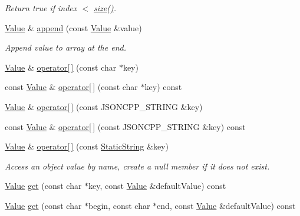 \begin{DoxyCompactItemize}
\begin{DoxyCompactList}\small\item\em Return true if index $<$ \hyperlink{class_json_1_1_value_a4ca8ee6c48a34ca6c2f131956bab5e05}{size()}. \end{DoxyCompactList}\item 
\hyperlink{class_json_1_1_value}{Value} \& \hyperlink{class_json_1_1_value_a7e49ac977e4bcf59745a09d426669f75}{append} (const \hyperlink{class_json_1_1_value}{Value} \&value)
\begin{DoxyCompactList}\small\item\em Append value to array at the end. \end{DoxyCompactList}\item 
\hyperlink{class_json_1_1_value}{Value} \& \hyperlink{class_json_1_1_value_acb912f4ec40a25ea6eb387730885f3d9}{operator\mbox{[}$\,$\mbox{]}} (const char $\ast$key)
\item 
const \hyperlink{class_json_1_1_value}{Value} \& \hyperlink{class_json_1_1_value_ae5f73ffc7a039bca81b7ca771bc5db55}{operator\mbox{[}$\,$\mbox{]}} (const char $\ast$key) const 
\item 
\hyperlink{class_json_1_1_value}{Value} \& \hyperlink{class_json_1_1_value_aedd1e152756a4cc8c1ebac0dd7aeeb78}{operator\mbox{[}$\,$\mbox{]}} (const J\+S\+O\+N\+C\+P\+P\+\_\+\+S\+T\+R\+I\+NG \&key)
\item 
const \hyperlink{class_json_1_1_value}{Value} \& \hyperlink{class_json_1_1_value_a4b4d53dead79ee347514170bd21590b8}{operator\mbox{[}$\,$\mbox{]}} (const J\+S\+O\+N\+C\+P\+P\+\_\+\+S\+T\+R\+I\+NG \&key) const 
\item 
\hyperlink{class_json_1_1_value}{Value} \& \hyperlink{class_json_1_1_value_ac3763d7d315ca65dc188e273722f7955}{operator\mbox{[}$\,$\mbox{]}} (const \hyperlink{class_json_1_1_static_string}{Static\+String} \&key)
\begin{DoxyCompactList}\small\item\em Access an object value by name, create a null member if it does not exist. \end{DoxyCompactList}\item 
\hyperlink{class_json_1_1_value}{Value} \hyperlink{class_json_1_1_value_ab76b3323cde14c7db20676d07b260ce7}{get} (const char $\ast$key, const \hyperlink{class_json_1_1_value}{Value} \&default\+Value) const 
\item 
\hyperlink{class_json_1_1_value}{Value} \hyperlink{class_json_1_1_value_abcb2289c005bc0befdedaa94f662f63f}{get} (const char $\ast$begin, const char $\ast$end, const \hyperlink{class_json_1_1_value}{Value} \&default\+Value) const 

\end{DoxyCompactItemize}
